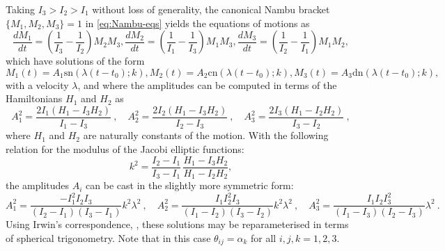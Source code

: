 \documentclass[fleqn,11pt,twoside]{article}
\newcommand{\bse}{\begin{subequations}}
\newcommand{\ese}{\end{subequations}}
\theoremstyle{definition}
\begin{document}
Taking $I_3>I_2>I_1$ without loss of generality, the canonical 
Nambu bracket $\{M_1,M_2,M_3\}=1$ in \eqref{eq:Nambu-eqs} 
yields the equations of motions as
\bse 
\begin{equation}
\frac{dM_1}{dt}=\left(\frac{1}{I_3}-\frac{1}{I_2}\right)M_2M_3,
\end{equation}
\begin{equation}
\frac{dM_2}{dt}=\left(\frac{1}{I_1}-\frac{1}{I_3}\right)M_1M_3,
\end{equation}
\begin{equation}
\frac{dM_3}{dt}=\left(\frac{1}{I_2}-\frac{1}{I_1}\right)M_1M_2,
\end{equation}\ese 
which have solutions of the form
\bse \begin{equation}
M_1(t)=A_1\mathrm{sn}(\lambda(t-t_0);k),
\end{equation}
\begin{equation}
M_2(t)=A_2\mathrm{cn}(\lambda(t-t_0);k),
\end{equation}
\begin{equation}
M_3(t)=A_3\mathrm{dn}(\lambda(t-t_0);k),
\end{equation}\ese 
with a velocity $\lambda$, and  
where the amplitudes can be computed in terms of the Hamiltonians $H_1$ and $H_2$ as   
\[ A_1^2=\frac{2I_1(H_1-I_3H_2)}{I_1-I_3}\ , \quad 
A_2^2=\frac{2I_2(H_1-I_3H_2)}{I_2-I_3}\ , \quad 
A_3^2=\frac{2I_3(H_1-I_2H_2)}{I_3-I_2}\  , \] 
where $H_1$ and $H_2$ are naturally constants of the motion. With the following relation for the modulus of the Jacobi elliptic functions: 
\begin{equation}
k^2=\frac{I_2-I_1}{I_3-I_1}\,\frac{H_1-I_3H_2}{H_1-I_2H_2}, 
\end{equation}
the amplitudes $A_i$ can be cast in the slightly more symmetric form: 
\[ A_1^2=\frac{-I_1^2I_2I_3}{(I_2-I_1)(I_3-I_1)}k^2\lambda^2\ , \quad 
A_2^2=\frac{I_1I_2^2I_3}{(I_1-I_2)(I_3-I_2)}k^2\lambda^2\ , \quad 
A_3^2=\frac{I_1I_2I_3^2}{(I_1-I_3)(I_2-I_3)}\lambda^2\ . \] 
Using Irwin's correspondence, \cite{irwin}, these solutions may be reparameterised in terms of spherical trigonometry. Note that in this case $\theta_{ij}=\alpha_k$ for all $i,j,k=1,2,3$.
\end{document}
